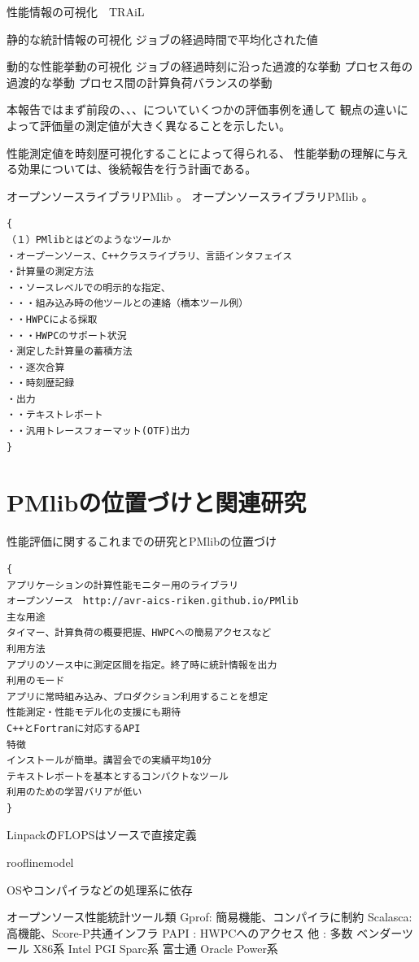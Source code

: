 \documentclass[submit,techrep,noauthor]{ipsj}
\begin{document}
性能情報の可視化　TRAiL

静的な統計情報の可視化
ジョブの経過時間で平均化された値

動的な性能挙動の可視化
ジョブの経過時刻に沿った過渡的な挙動
プロセス毎の過渡的な挙動
プロセス間の計算負荷バランスの挙動

本報告ではまず前段の、、、についていくつかの評価事例を通して
観点の違いによって評価量の測定値が大きく異なることを示したい。

性能測定値を時刻歴可視化することによって得られる、
性能挙動の理解に与える効果については、後続報告を行う計画である。

オープンソースライブラリPMlib \cite{PMlib1:webpage}。
オープンソースライブラリPMlib \cite{PMlib2:webpage}。

\begin{verbatim}
{
（１）PMlibとはどのようなツールか
・オープーンソース、C++クラスライブラリ、言語インタフェイス
・計算量の測定方法
・・ソースレベルでの明示的な指定、
・・・組み込み時の他ツールとの連絡（橋本ツール例）
・・HWPCによる採取
・・・HWPCのサポート状況
・測定した計算量の蓄積方法
・・逐次合算
・・時刻歴記録
・出力
・・テキストレポート
・・汎用トレースフォーマット(OTF)出力
}
\end{verbatim}

\section{PMlibの位置づけと関連研究}
性能評価に関するこれまでの研究とPMlibの位置づけ

\begin{verbatim}
{
アプリケーションの計算性能モニター用のライブラリ
オープンソース　http://avr-aics-riken.github.io/PMlib
主な用途
タイマー、計算負荷の概要把握、HWPCへの簡易アクセスなど
利用方法
アプリのソース中に測定区間を指定。終了時に統計情報を出力
利用のモード
アプリに常時組み込み、プロダクション利用することを想定
性能測定・性能モデル化の支援にも期待
C++とFortranに対応するAPI 
特徴
インストールが簡単。講習会での実績平均10分
テキストレポートを基本とするコンパクトなツール
利用のための学習バリアが低い
}
\end{verbatim}

LinpackのFLOPSはソースで直接定義


rooflinemodel

OSやコンパイラなどの処理系に依存

オープンソース性能統計ツール類 {
Gprof: 簡易機能、コンパイラに制約
Scalasca: 高機能、Score-P共通インフラ
PAPI : HWPCへのアクセス
他 : 多数
}
ベンダーツール {
X86系
Intel
PGI
Sparc系
富士通
Oracle
Power系
}
\end{document}
